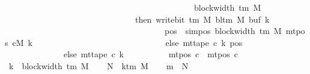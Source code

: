 \begin{isabellebody}
\ \ \ \ \ \ \ \ \ \ \ \ \ \ \ \ \ \ \ \ \ \ \ \ \ \ \ \ \ \ \ \ \ \ \ \ \ \ \ \ \ \ \ \ {\isacharplus}{\kern0pt}\ block{\isacharunderscore}{\kern0pt}width\ {\isacharparenleft}{\kern0pt}{\isasymGamma}{\isacharunderscore}{\kern0pt}tm\ M{\isacharparenright}{\kern0pt}\isanewline
\ \ \ \ \ \ \ \ \ \ \ \ \ \ \ \ \ \ \ \ \ \ \ \ \ \ \ \ \ \ \ then\ write{\isacharunderscore}{\kern0pt}bit\ {\isacharparenleft}{\kern0pt}{\isasymGamma}{\isacharunderscore}{\kern0pt}tm\ M{\isacharparenright}{\kern0pt}\ {\isacharparenleft}{\kern0pt}bl{\isacharunderscore}{\kern0pt}tm\ M{\isacharparenright}{\kern0pt}\ {\isacharparenleft}{\kern0pt}buf\ k{\isacharparenright}{\kern0pt}\isanewline
\ \ \ \ \ \ \ \ \ \ \ \ \ \ \ \ \ \ \ \ \ \ \ \ \ \ \ \ \ \ \ \ \ \ \ \ \ \ {\isacharparenleft}{\kern0pt}pos\ {\isacharminus}{\kern0pt}\ sim{\isacharunderscore}{\kern0pt}pos\ {\isacharparenleft}{\kern0pt}block{\isacharunderscore}{\kern0pt}width\ {\isacharparenleft}{\kern0pt}{\isasymGamma}{\isacharunderscore}{\kern0pt}tm\ M{\isacharparenright}{\kern0pt}{\isacharparenright}{\kern0pt}\ {\isacharparenleft}{\kern0pt}mt{\isacharunderscore}{\kern0pt}pos\ cM\ k{\isacharparenright}{\kern0pt}{\isacharparenright}{\kern0pt}\isanewline
\ \ \ \ \ \ \ \ \ \ \ \ \ \ \ \ \ \ \ \ \ \ \ \ \ \ \ \ \ \ \ else\ mt{\isacharunderscore}{\kern0pt}tape\ c{}\ k\ pos{\isacharparenright}{\kern0pt}{\isacharparenright}{\kern0pt}\isanewline
\ \ \ \ \ \ \ \ \ \ \ \ \ \ else\ mt{\isacharunderscore}{\kern0pt}tape\ c{}\ k{\isacharparenright}{\kern0pt}\isanewline
\ \ \ \ \ \ \ \ \ {\isasymand}\ mt{\isacharunderscore}{\kern0pt}pos\ c\ {\isacharequal}{\kern0pt}\ mt{\isacharunderscore}{\kern0pt}pos\ c{}{\isachardoublequoteclose}\isanewline
%
\isadelimproof
%
\endisadelimproof
%
\isatagproof
{}\isamarkupfalse%
\ {\isacharminus}{\kern0pt}\isanewline
\ \ \isamarkupfalse%
\ {\isacharquery}{\kern0pt}k\ {\isacharequal}{\kern0pt}\ {\isachardoublequoteopen}block{\isacharunderscore}{\kern0pt}width\ {\isacharparenleft}{\kern0pt}{\isasymGamma}{\isacharunderscore}{\kern0pt}tm\ M{\isacharparenright}{\kern0pt}{\isachardoublequoteclose}\isanewline
\ \ \isamarkupfalse%
\ {\isacharquery}{\kern0pt}N\ {\isacharequal}{\kern0pt}\ {\isachardoublequoteopen}k{\isacharunderscore}{\kern0pt}tm\ M{\isachardoublequoteclose}\isanewline
\ \ \isamarkupfalse%
\ {\isacharquery}{\kern0pt}m{}\ {\isacharequal}{\kern0pt}\ {\isachardoublequoteopen}{\isacharquery}{\kern0pt}N\ {\isacharminus}{\kern0pt}\ {}{\isachardoublequoteclose}\isanewline
\ \ \isamarkupfalse%

\end{isabellebody}
